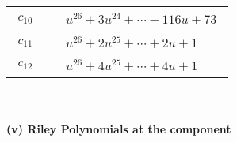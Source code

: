 \documentclass[1p]{elsarticle_modified}
\theoremstyle{definition}
\begin{document}
\begin{tabular}{m{50pt}|m{274pt}}
\hline $$\begin{aligned}c_{10}\end{aligned}$$&$\begin{aligned}
&u^{26}+3 u^{24}+\cdots-116 u+73
\end{aligned}$\\
\hline $$\begin{aligned}c_{11}\end{aligned}$$&$\begin{aligned}
&u^{26}+2 u^{25}+\cdots+2 u+1
\end{aligned}$\\
\hline $$\begin{aligned}c_{12}\end{aligned}$$&$\begin{aligned}
&u^{26}+4 u^{25}+\cdots+4 u+1
\end{aligned}$\\
\hline
\end{tabular}\\~\\
\newpage\renewcommand{\arraystretch}{1}
\flushleft \textbf{(v) Riley Polynomials at the component}\newline \\
\end{document}
